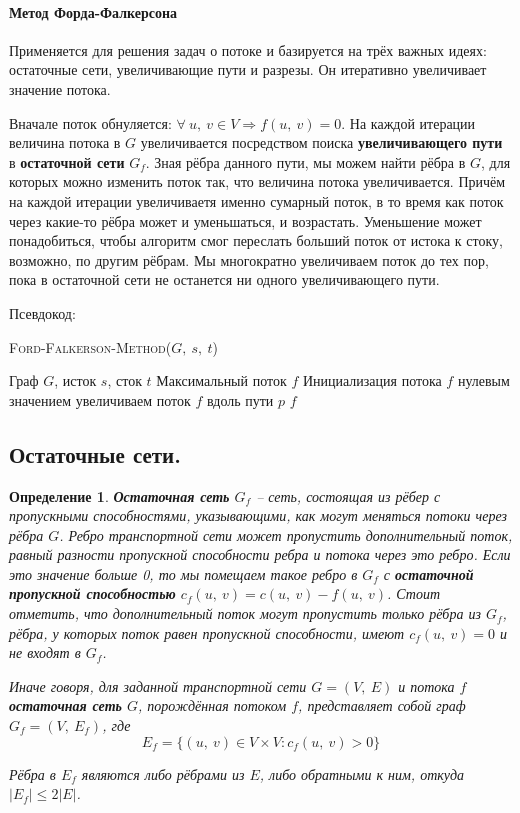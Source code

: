 \documentclass[a4paper,12pt]{article}
\newcommand{\algname}[1]{\textsc{#1}}
\newtheorem*{definition}{Определение}
\begin{document}
\paragraph{Метод Форда-Фалкерсона}

Применяется для решения задач о потоке и базируется на трёх важных идеях: остаточные сети, увеличивающие пути и разрезы. Он итеративно увеличивает значение потока.

Вначале поток обнуляется: $\forall\ u,\ v \in V \Rightarrow f(u,\ v) = 0$. На каждой итерации величина потока в $G$ увеличивается посредством поиска \textbf{увеличивающего пути} в \textbf{остаточной сети} $G_f$. Зная рёбра данного пути, мы можем найти рёбра в $G$, для которых можно изменить поток так, что величина потока увеличивается. Причём на каждой итерации увеличиваетя именно сумарный поток, в то время как поток через какие-то рёбра может и уменьшаться, и возрастать. Уменьшение может понадобиться, чтобы алгоритм смог переслать больший поток от истока к стоку, возможно, по другим рёбрам. Мы многократно увеличиваем поток до тех пор, пока в остаточной сети не останется ни одного увеличивающего пути.

Псевдокод:

\begin{algorithm}
  	\caption{\algname{Ford-Falkerson-Method}($G,\ s,\ t$)}
	\begin{algorithmic}
	    \Require Граф $G$, исток $s$, сток $t$
	    \Ensure Максимальный поток $f$
	    \State Инициализация потока $f$ нулевым значением
	        \State увеличиваем поток $f$ вдоль пути $p$
	    \EndWhile
	    \State \Return $f$
	\end{algorithmic}
\end{algorithm}

\subsection{Остаточные сети.}

\begin{definition}
    \textbf{Остаточная сеть} $G_f$ -- сеть, состоящая из рёбер с пропускными способностями, указывающими, как могут меняться потоки через рёбра $G$. Ребро транспортной сети может пропустить дополнительный поток, равный разности пропускной способности ребра и потока через это ребро. Если это значение больше 0, то мы помещаем такое ребро в $G_f$ с \textbf{остаточной пропускной способностью} $c_f(u,\ v) = c(u,\ v) - f(u,\ v)$. Стоит отметить, что дополнительный поток могут пропустить только рёбра из $G_f$, рёбра, у которых поток равен пропускной способности, имеют $c_f(u,\ v) = 0$ и не входят в $G_f$.
    
    Иначе говоря, для заданной транспортной сети $G = (V,\ E)$ и потока $f$ \textbf{остаточная сеть} $G$, порождённая потоком $f$, представляет собой граф $G_f = (V,\ E_f)$, где \[E_f = \{(u,\ v) \in V\times V : c_f(u,\ v) > 0\}\]
    
    Рёбра в  $E_f$ являются либо рёбрами из $E$, либо обратными к ним, откуда $|E_f| \leqslant 2|E|$.
\end{definition}
\end{document}
